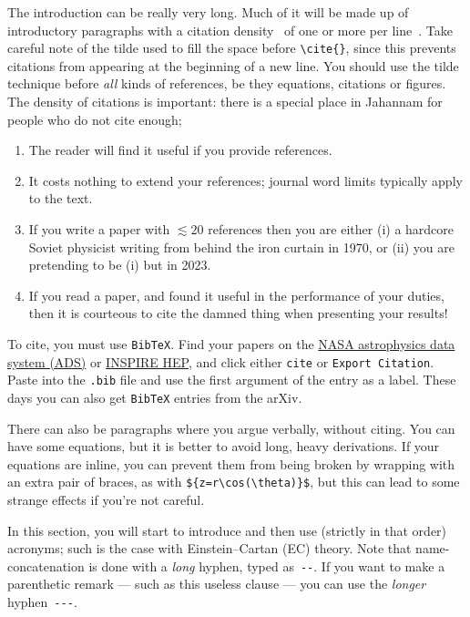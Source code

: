 \documentclass[aps,prd,reprint,preprintnumbers,showpacs,floatfix,nofootinbib,superscript address]{revtex4-2}
\begin{document}
The introduction can be really very long. Much of it will be made up of introductory paragraphs with a citation density~\cite{Heisenberg:2020xak} of one or more per line~\cite{PhysRevD.28.286,Shaposhnikov:2020aen}. Take careful note of the tilde used to fill the space before \texttt{\textbackslash cite\{\}}, since this prevents citations from appearing at the beginning of a new line. You should use the tilde technique before \emph{all} kinds of references, be they equations, citations or figures. The density of citations is important: there is a special place in Jahannam for people who do not cite enough;
\begin{enumerate}
\item The reader will find it useful if you provide references.
\item It costs nothing to extend your references; journal word limits typically apply to the text. 
\item If you write a paper with $\lesssim 20$ references then you are either (i) a hardcore Soviet physicist writing from behind the iron curtain in 1970, or (ii) you are pretending to be (i) but in 2023.
\item If you read a paper, and found it useful in the performance of your duties, then it is courteous to cite the damned thing when presenting your results!
\end{enumerate}
To cite, you must use \texttt{BibTeX}. Find your papers on the \href{https://ui.adsabs.harvard.edu/}{NASA astrophysics data system (ADS)} or \href{https://inspirehep.net/}{INSPIRE HEP}, and click either \texttt{cite} or \texttt{Export Citation}. Paste into the \texttt{.bib} file and use the first argument of the entry as a label. These days you can also get \texttt{BibTeX} entries from the arXiv.

There can also be paragraphs where you argue verbally, without citing. You can have some equations, but it is better to avoid long, heavy derivations. If your equations are inline, you can prevent them from being broken by wrapping with an extra pair of braces, as with \texttt{\$\{z=r\textbackslash cos(\textbackslash theta)\}\$}, but this can lead to some strange effects if you're not careful.

In this section, you will start to introduce and then use (strictly in that order) acronyms; such is the case with Einstein--Cartan (EC) theory. Note that name-concatenation is done with a \emph{long} hyphen, typed as~\texttt{-{-}}. If you want to make a parenthetic remark --- such as this useless clause --- you can use the \emph{longer} hyphen~\texttt{-{-}{-}}.
\end{document}
